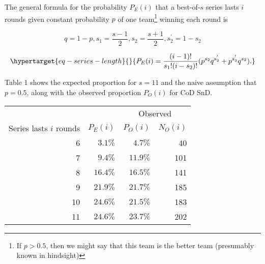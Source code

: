 \documentclass[
]{article}
\begin{document}
The general formula for the probability \(P_E(i)\) that a best-of-\(s\)
series lasts \(i\) rounds given constant probability \(p\) of one
team\footnote{If \(p > 0.5\), then we might say that this team is the
  better team (presumably known in hindsight)} winning each round is

\[
q = 1 - p, s_1 = \frac{s - 1}{2}, s_2 = \frac{s + 1}{2}, s_2^{'} = 1 - s_2
\]

\begin{equation}\protect\hypertarget{eq-series-length}{}{
P_E(i) = \frac{(i - 1)!}{s_1!(i - s_2)!}(p^{s_2}q^{s_2^{'}} + p^{s_2^{'}}q^{s_2}).
}\label{eq-series-length}\end{equation}

Table 1 shows the expected proportion for \(s = 11\) and the naive
assumption that \(p = 0.5\), along with the observed proportion
\(P_{O}(i)\) for CoD SnD.

\begin{table}

\caption{\label{tbl-panel}: The probabilities that a best-of-11 series
lasts \(i\) rounds (\(P(i)\), where \(i \in R = [6, 7, 8, 9, 10, 11]\))
under the assumption that each team has a 50\% probability (\(p = 0.5\))
of winning each game \{\#tbl-prob-series-lasting-i-rounds\} along with
the observed frequencies of series lasting \(i\) rounds, expressed as a
percentage \(P_O(i)\) and as a count
(\(N_O\))}\begin{minipage}[t]{\linewidth}
\subcaption{\label{tbl-panel-1}}

{\centering 

\captionsetup[table]{labelformat=empty,skip=1pt}
\begin{longtable}{rrrr}
\toprule
&  & \multicolumn{2}{c}{Observed} \\ 
\cmidrule(lr){3-4}
Series lasts $i$ rounds & $P_E(i)$ & $P_O(i)$ & $N_O(i)$ \\ 
\midrule
6 & $3.1\%$ & $4.7\%$ & 40 \\ 
7 & $9.4\%$ & $11.9\%$ & 101 \\ 
8 & $16.4\%$ & $16.5\%$ & 141 \\ 
9 & $21.9\%$ & $21.7\%$ & 185 \\ 
10 & $24.6\%$ & $21.5\%$ & 183 \\ 
11 & $24.6\%$ & $23.7\%$ & 202 \\ 
\bottomrule
\end{longtable}

}

\end{minipage}%

\end{table}
\end{document}
